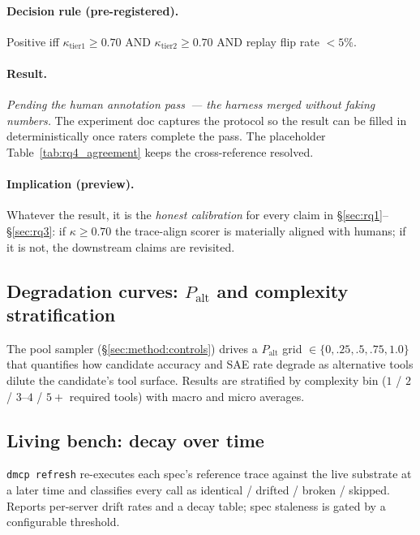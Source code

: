 \paragraph{Decision rule (pre-registered).} Positive iff
$\kappa_{\text{tier1}} \geq 0.70$ AND $\kappa_{\text{tier2}} \geq 0.70$
AND replay flip rate $< 5\%$.

\paragraph{Result.} \emph{Pending the human annotation pass~--- the
harness merged without faking numbers.} The experiment doc captures
the protocol so the result can be filled in deterministically once
raters complete the pass. The placeholder
Table~\ref{tab:rq4_agreement} keeps the cross-reference resolved.



\paragraph{Implication (preview).} Whatever the result, it is the
\emph{honest calibration} for every claim in
\S\ref{sec:rq1}--\S\ref{sec:rq3}: if $\kappa \geq 0.70$ the trace-align
scorer is materially aligned with humans; if it is not, the downstream
claims are revisited.

\subsection{Degradation curves: $P_{\text{alt}}$ and complexity stratification}
\label{sec:rq_palt}

The pool sampler (\S\ref{sec:method:controls}) drives a $P_{\text{alt}}$
grid $\in \{0, .25, .5, .75, 1.0\}$ that quantifies how candidate
accuracy and SAE rate degrade as alternative tools dilute the
candidate's tool surface. Results are stratified by complexity bin
($1$ / $2$ / $3$--$4$ / $5+$ required tools) with macro and micro
averages.



\subsection{Living bench: decay over time}
\label{sec:rq_decay}

\texttt{dmcp refresh} re-executes each spec's reference trace against
the live substrate at a later time and classifies every call as
identical / drifted / broken / skipped. Reports per-server drift rates
and a decay table; spec staleness is gated by a configurable threshold.

